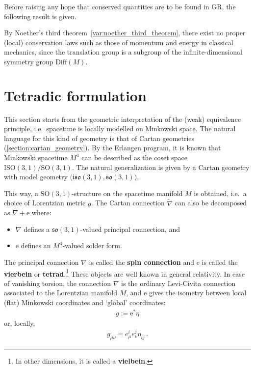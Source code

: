     Before raising any hope that conserved quantities are to be found in GR, the following result is given.
    \begin{property}
        By Noether's third theorem~\ref{var:noether_third_theorem}, there exist no proper (local) conservation laws such as those of momentum and energy in classical mechanics, since the translation group is a subgroup of the infinite-dimensional symmetry group $\mathrm{Diff}(M)$.
    \end{property}


\section{Tetradic formulation}

    This section starts from the geometric interpretation of the (weak) equivalence principle, i.e.~spacetime is locally modelled on Minkowski space. The natural language for this kind of geometry is that of Cartan geometries (\cref{section:cartan_geometry}). By the Erlangen program, it is known that Minkowski spacetime $M^4$ can be described as the coset space $\mathrm{ISO}(3,1)/\mathrm{SO}(3,1)$. The natural generalization is given by a Cartan geometry with model geometry $\bigl(\mathfrak{iso}(3,1),\mathfrak{so}(3,1)\bigr)$.

    \begin{property}
        This way, a $\mathrm{SO}(3,1)$-structure on the spacetime manifold $M$ is obtained, i.e.~a choice of Lorentzian metric $g$. The Cartan connection $\widetilde{\nabla}$ can also be decomposed as $\nabla+\mathrm{e}$ where:
        \begin{itemize}
            \item $\nabla$ defines a $\mathfrak{so}(3,1)$-valued principal connection, and
            \item $\mathrm{e}$ defines an $M^4$-valued solder form.
        \end{itemize}
        The principal connection $\nabla$ is called the \textbf{spin connection} and $\mathrm{e}$ is called the \textbf{vierbein} or \textbf{tetrad}.\footnote{In other dimensions, it is called a \textbf{vielbein}.} These objects are well known in general relativity. In case of vanishing torsion, the connection $\nabla$ is the ordinary Levi-Civita connection associated to the Lorentzian manifold $M$, and $\mathrm{e}$ gives the isometry between local (flat) Minkowski coordinates and `global' coordinates:
        \begin{gather}
            g := \mathrm{e}^*\eta
        \end{gather}
        or, locally,
        \begin{gather}
            g_{\mu\nu} = e^i_\mu e^j_\nu\eta_{ij}\,.
        \end{gather}
    \end{property}

